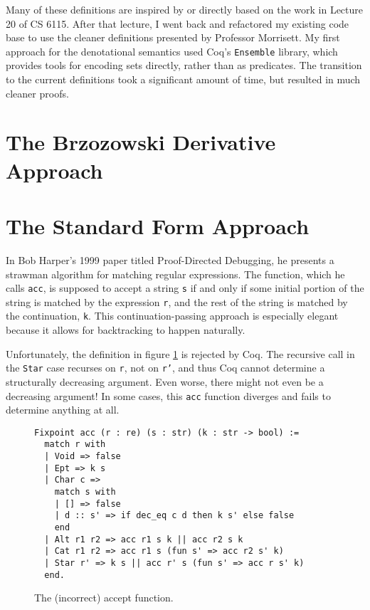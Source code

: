 \documentclass{article}
\newcommand{\coq}[1]{\texttt{#1}}
\begin{document}
Many of these definitions are inspired by or directly based on the work in
Lecture 20 of CS 6115. After that lecture, I went back and refactored my
existing code base to use the cleaner definitions presented by Professor
Morrisett. My first approach for the denotational semantics used Coq's
\coq{Ensemble} library, which provides tools for encoding sets directly, rather
than as predicates. The transition to the current definitions took a significant
amount of time, but resulted in much cleaner proofs.

\section{The Brzozowski Derivative Approach} \label{deriv}

\section{The Standard Form Approach} \label{standard}
In Bob Harper's 1999 paper titled Proof-Directed
Debugging,\cite{Harper:1999:PD:968578.968582} he presents a strawman algorithm
for matching regular expressions. The function, which he calls \coq{acc}, is
supposed to accept a string \coq{s} if and only if some initial portion of the
string is matched by the expression \coq{r}, and the rest of the string is
matched by the continuation, \coq{k}. This continuation-passing approach is
especially elegant because it allows for backtracking to happen naturally.

Unfortunately, the definition in figure \ref{fig:acc} is rejected by Coq. The
recursive call in the \coq{Star} case recurses on \coq{r}, not on \coq{r'}, and
thus Coq cannot determine a structurally decreasing argument. Even worse, there
might not even be a decreasing argument! In some cases, this \coq{acc} function
diverges and fails to determine anything at all.

\begin{figure}
  \centering
\begin{verbatim}
Fixpoint acc (r : re) (s : str) (k : str -> bool) :=
  match r with
  | Void => false
  | Ept => k s
  | Char c =>
    match s with
    | [] => false
    | d :: s' => if dec_eq c d then k s' else false
    end
  | Alt r1 r2 => acc r1 s k || acc r2 s k
  | Cat r1 r2 => acc r1 s (fun s' => acc r2 s' k)
  | Star r' => k s || acc r' s (fun s' => acc r s' k)
  end.
\end{verbatim}
\caption{The (incorrect) accept function.}
\label{fig:acc}
\end{figure}
\end{document}
